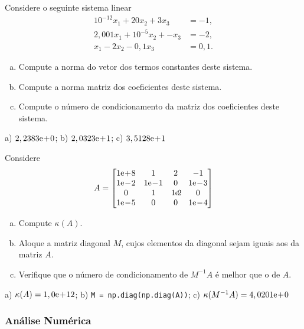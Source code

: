 \begin{exer}
  Considere o seguinte sistema linear
  \begin{align}
    10^{-12}x_1 + 20x_2 + 3x_3 &= -1,\\
    2,001x_1 + 10^{-5}x_2 + - x_3 &= -2,\\
    x_1 - 2x_2 - 0,1x_3 &= 0,1.
  \end{align}
  \begin{enumerate}[a)]
  \item Compute a norma do vetor dos termos constantes deste sistema.
  \item Compute a norma matriz dos coeficientes deste sistema.
  \item Compute o número de condicionamento da matriz dos coeficientes deste sistema.
  \end{enumerate}
\end{exer}
\begin{resp}
  a) $2,2383\mathrm{e}\!+\!0$; b) $2,0323\mathrm{e}\!+\!1$; c) $3,5128\mathrm{e}\!+\!1$
\end{resp}

\begin{exer}
  Considere
  \begin{equation}
    A =
    \begin{bmatrix}
      1\E+8 & 1 & 2 & -1\\
      1\E-2 & 1\E-1 & 0 & 1\E-3\\
      0 & 1 & 1\E2 & 0\\
      1\E-5 & 0 & 0 & 1\E-4
    \end{bmatrix}
  \end{equation}
  \begin{enumerate}[a)]
  \item Compute $\kappa(A)$.
  \item Aloque a matriz diagonal $M$, cujos elementos da diagonal sejam iguais aos da matriz $A$.
  \item Verifique que o número de condicionamento de $M^{-1}A$ é melhor que o de $A$.
  \end{enumerate}
\end{exer}
\begin{resp}
  a) $\kappa(A) = 1,0\mathrm{e}\!+\!12$; b) \lstinline+M = np.diag(np.diag(A))+; c) $\kappa(M^{-1}A) = 4,0201\mathrm{e}\!+\!0$
\end{resp}

\subsubsection{Análise Numérica}

